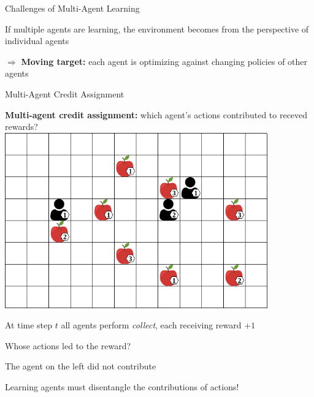 	\begin{frame}{Challenges of Multi-Agent Learning}
		\bcol
				
				\vspace{5pt}
				
				If multiple agents are learning, the environment becomes  from the perspective of individual agents
				
				\vspace{15pt}
				
				$\Rightarrow$ {\bf Moving target:} each agent is optimizing against changing policies of other agents
				
				\vspace{10pt}
		\ecol
	\end{frame}

\begin{frame}{Multi-Agent Credit Assignment}

{\bf Multi-agent credit assignment:} which agent's actions contributed to receved rewards? \\[15pt]

\bcol
            \centering
            \includegraphics[width=0.85\textwidth]{images/environments/lbf/foraging_8x12_b.png}

        \blist
            \item At time step $t$ all agents perform \textit{collect}, each receiving reward $+1$
            \item Whose actions led to the reward?
            \item The agent on the left did not contribute
            \item Learning agents must disentangle the contributions of actions!
        \elist

\ecol
    
\end{frame}


